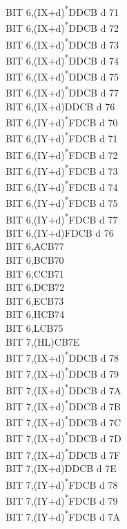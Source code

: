 \documentclass[twoside,openright,a4paper]{book}
\begin{document}
\begin{multicols}{3}
{\begin{tabbing}
	BIT 6,(IX+d)\textsuperscript{*}\>DDCB d 71\\
	BIT 6,(IX+d)\textsuperscript{*}\>DDCB d 72\\
	BIT 6,(IX+d)\textsuperscript{*}\>DDCB d 73\\
	BIT 6,(IX+d)\textsuperscript{*}\>DDCB d 74\\
	BIT 6,(IX+d)\textsuperscript{*}\>DDCB d 75\\
	BIT 6,(IX+d)\textsuperscript{*}\>DDCB d 77\\
	BIT 6,(IX+d)\>DDCB d 76\\
	BIT 6,(IY+d)\textsuperscript{*}\>FDCB d 70\\
	BIT 6,(IY+d)\textsuperscript{*}\>FDCB d 71\\
	BIT 6,(IY+d)\textsuperscript{*}\>FDCB d 72\\
	BIT 6,(IY+d)\textsuperscript{*}\>FDCB d 73\\
	BIT 6,(IY+d)\textsuperscript{*}\>FDCB d 74\\
	BIT 6,(IY+d)\textsuperscript{*}\>FDCB d 75\\
	BIT 6,(IY+d)\textsuperscript{*}\>FDCB d 77\\
	BIT 6,(IY+d)\>FDCB d 76\\
	BIT 6,A\>CB77\\
	BIT 6,B\>CB70\\
	BIT 6,C\>CB71\\
	BIT 6,D\>CB72\\
	BIT 6,E\>CB73\\
	BIT 6,H\>CB74\\
	BIT 6,L\>CB75\\
	BIT 7,(HL)\>CB7E\\
	BIT 7,(IX+d)\textsuperscript{*}\>DDCB d 78\\
	BIT 7,(IX+d)\textsuperscript{*}\>DDCB d 79\\
	BIT 7,(IX+d)\textsuperscript{*}\>DDCB d 7A\\
	BIT 7,(IX+d)\textsuperscript{*}\>DDCB d 7B\\
	BIT 7,(IX+d)\textsuperscript{*}\>DDCB d 7C\\
	BIT 7,(IX+d)\textsuperscript{*}\>DDCB d 7D\\
	BIT 7,(IX+d)\textsuperscript{*}\>DDCB d 7F\\
	BIT 7,(IX+d)\>DDCB d 7E\\
	BIT 7,(IY+d)\textsuperscript{*}\>FDCB d 78\\
	BIT 7,(IY+d)\textsuperscript{*}\>FDCB d 79\\
	BIT 7,(IY+d)\textsuperscript{*}\>FDCB d 7A\\

\end{tabbing}}
\end{multicols}
\end{document}
